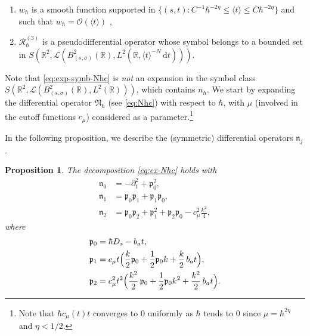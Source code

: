 \documentclass[10pt]{amsart}
\let\sep:
\newcommand{\rd}{\,\mathrm{d}}
\theoremstyle{plain}
\newtheorem{proposition}[theorem]{Proposition}
\theoremstyle{definition}
\newcommand{\R}{\mathbb{R}}
\begin{document}
\begin{enumerate}
\item\label{eq.i} $w_{\hbar}$ is a smooth function supported in $\{(s,t) \sep C^{-1}\hbar^{-2\eta}\leq \langle t\rangle\leq C\hbar^{-2\eta}\}$ and such that $w_\hbar=\mathscr{O}(\langle t\rangle)$ ,
\item \label{eq.ii}$\mathscr R_\hbar^{(3)}$ is a pseudodifferential operator whose symbol belongs to a bounded set in $S(\R^2,\mathscr{L}(B_{(s,\sigma)}^2(\R),L^2(\R,\langle t\rangle^{-N}\rd t)))$.
\end{enumerate}
Note that \eqref{eq:exp-symb-Nhc} is {\it not} an expansion in the symbol class $S(\R^2,\mathscr{L}(B_{(s,\sigma)}^2(\R),L^2(\R)))$, which contains $n_{\hbar}$.
We start by expanding the differential operator $\mathfrak{N}_{\hbar}$ (see \eqref{eq:Nhc}) with respect to $\hbar$, with $\mu$ (involved in the cutoff functions $c_\mu$) considered as a parameter.\footnote{Note that $\hbar c_{\mu}(t)t$ converges to $0$ uniformly as $\hbar$ tends to $0$ since $\mu=\hbar^{2\eta}$ and $\eta<1/2$.}

In the following proposition, we describe the (symmetric) differential operators $\mathfrak{n}_j$.
\begin{proposition}
The decomposition \eqref{eq:ex-Nhc} holds with
\begin{equation}\label{eq:ex-terms}
\begin{aligned}
\mathfrak n_0&=-\partial_t^2+\mathfrak{p}_0^2,\\
\mathfrak n_1&=\mathfrak p_0\mathfrak p_1+\mathfrak p_1\mathfrak p_0,\\
\mathfrak n_2&=\mathfrak p_0\mathfrak p_2+\mathfrak p_1^2+\mathfrak p_2\mathfrak p_0-c_\mu^2\frac{k^2}{4},
\end{aligned}
\end{equation} 
where
\begin{equation}\label{eq:D-theta}
\begin{aligned}
\mathfrak{p}_0&=\hbar D_s-b_a t,\\
\mathfrak{p}_1 &=c_\mu t\Bigl(\frac{k}2\mathfrak p_0+\frac12\mathfrak p_0k+\frac{k}2\, b_at \Bigr),\\
\mathfrak{p}_2&=c_\mu^2t^2\Bigl(\frac{k^2}{2}\,\mathfrak p_0+\frac12\mathfrak p_0k^2+\frac{k^2}2\,b_at \Bigr).
\end{aligned}
\end{equation}
\end{proposition}
\end{document}

